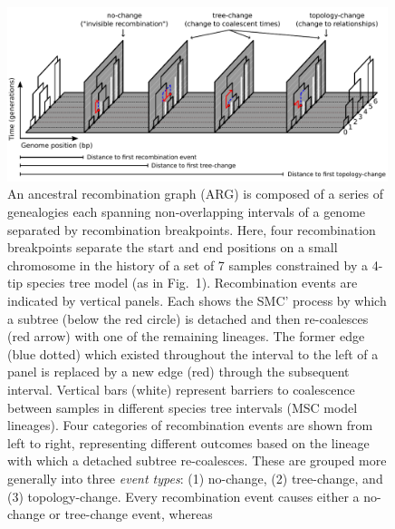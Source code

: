 \documentclass[11pt]{article}
\begin{document}
\begin{figure}[t]
	\centering
	\includegraphics[width=0.99\textwidth]{figures/Fig2-ARG-recomb-types.pdf}
	\caption{
		An ancestral recombination graph (ARG)
		is composed of a series of genealogies each spanning non-overlapping 
		intervals of a genome separated by recombination breakpoints. Here, 
		four recombination breakpoints separate the start and end positions 
		on a small chromosome in the history of a set of 7 samples constrained
		by a 4-tip species tree model (as in Fig.~1).
		Recombination events are indicated by vertical panels. Each shows the SMC' process by 
		which a subtree (below the red circle) is detached and then re-coalesces (red arrow)
		with one of the remaining lineages. %
		The former edge (blue dotted) which existed throughout the interval to the left of a 
		panel is replaced by a new edge (red) through the subsequent interval. Vertical bars 
		(white) represent barriers to coalescence between samples in different species
		tree intervals (MSC model lineages).
		Four categories of recombination events are shown from left to right, representing
		different outcomes based on the lineage with which a detached subtree re-coalesces.
		These are grouped more generally into 
		three \emph{event types}: (1) no-change, (2) tree-change, and (3) topology-change.
		Every recombination event causes either a no-change or tree-change event, whereas
}
\end{figure}
\end{document}
